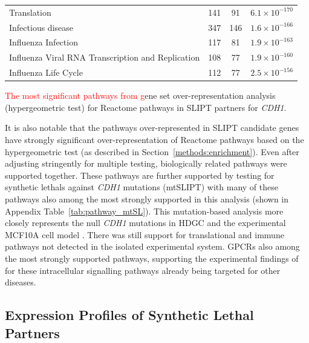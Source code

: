 \begin{table}[!ht]
{\begin{threeparttable}
\begin{tabular}{lccc}
  \rowcolor{black!5}
  Translation & 141 &  91 & $6.1 \times 10^{-170}$ \\ 
  \rowcolor{black!10}
  Infectious disease & 347 & 146 & $1.6 \times 10^{-166}$ \\ 
  \rowcolor{black!5}
  Influenza Infection & 117 &  81 & $1.9 \times 10^{-163}$ \\ 
  \rowcolor{black!10}
  Influenza Viral \acrshort{RNA} Transcription and Replication & 108 &  77 & $1.9 \times 10^{-160}$ \\ 
  \rowcolor{black!5}
  Influenza Life Cycle & 112 &  77 & $2.5 \times 10^{-156}$ \\ 
   \hline
\end{tabular}
\begin{tablenotes}
\raggedright %
\textcolor{red}{The most significant pathways from g}ene set over-representation analysis (hypergeometric test) for Reactome \glspl{pathway} in \gls{SLIPT} partners for \textit{CDH1}.
\end{tablenotes}
\end{threeparttable}
}
\end{table}

It is also notable that the \glspl{pathway} over-represented in \gls{SLIPT} candidate genes have strongly significant over-representation of Reactome \glspl{pathway} based on the hypergeometric test (as described in Section~\ref{methods:enrichment}). Even after adjusting stringently for multiple testing, biologically related \glspl{pathway} were supported together. These \glspl{pathway} are further supported by testing for \glspl{synthetic lethal} against \textit{CDH1} \glspl{mutation} (\acrshort{mtSLIPT}) with many of these \glspl{pathway} also among the most strongly supported in this analysis (shown in Appendix Table~\ref{tab:pathway_mtSL}). This \gls{mutation}-based analysis more closely represents the null \textit{CDH1} \glspl{mutation} in \gls{HDGC} \citep{Guilford1998} and the experimental MCF10A cell model \citep{Chen2014}. There was still support for translational and immune \glspl{pathway} not detected in the isolated experimental system.  \glspl{GPCR} also among the most strongly supported \glspl{pathway}, supporting the experimental findings of \citet{Telford2015} for these intracellular signalling \glspl{pathway} already being targeted for other diseases. 


\FloatBarrier


\subsection{Expression Profiles of Synthetic Lethal Partners} \label{chapt3:exprSL_clusters}

